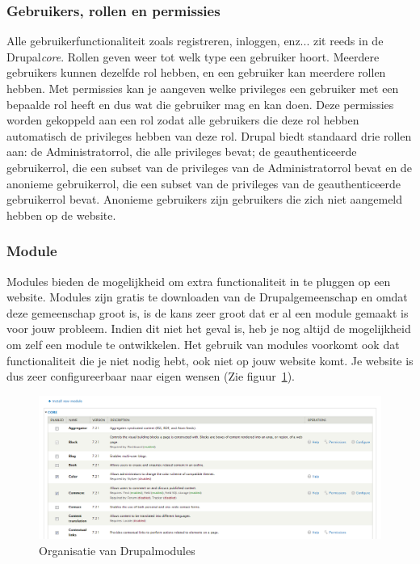 \subsubsection{Gebruikers, rollen en permissies}
Alle gebruikerfunctionaliteit zoals registreren, inloggen, enz... zit reeds in de Drupal\textit{core}. Rollen geven weer tot welk type een gebruiker hoort. Meerdere gebruikers kunnen dezelfde rol hebben, en een gebruiker kan meerdere rollen hebben. Met permissies kan je aangeven welke privileges een gebruiker met een bepaalde rol heeft en dus wat die gebruiker mag en kan doen. Deze permissies worden gekoppeld aan een rol zodat alle gebruikers die deze rol hebben automatisch de privileges hebben van deze rol. Drupal biedt standaard drie rollen aan: de Administratorrol, die alle privileges bevat; de geauthenticeerde gebruikerrol, die een subset van de privileges van de Administratorrol bevat en de anonieme gebruikerrol, die een subset van de privileges van de geauthenticeerde gebruikerrol bevat. Anonieme gebruikers zijn gebruikers die zich niet aangemeld hebben op de website.

\subsubsection{Module}
Modules bieden de mogelijkheid om extra functionaliteit in te pluggen op een website. Modules zijn gratis te downloaden van de Drupalgemeenschap en omdat deze gemeenschap groot is, is de kans zeer groot dat er al een module gemaakt is voor jouw probleem. Indien dit niet het geval is, heb je nog altijd de mogelijkheid om zelf een module te ontwikkelen. Het gebruik van modules voorkomt ook dat functionaliteit die je niet nodig hebt, ook niet op jouw website komt. Je website is dus zeer configureerbaar naar eigen wensen (Zie figuur~\ref{fig:drupalOrganizeModules}).
\begin{figure}[h]
\includegraphics[width=1\textwidth]{fig/drupalOrganizeModules}
\caption{Organisatie van Drupalmodules}
\label{fig:drupalOrganizeModules}
\end{figure}


